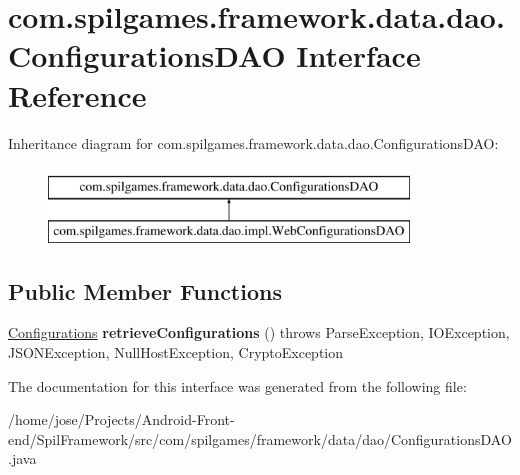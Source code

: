 \hypertarget{interfacecom_1_1spilgames_1_1framework_1_1data_1_1dao_1_1_configurations_d_a_o}{\section{com.\-spilgames.\-framework.\-data.\-dao.\-Configurations\-D\-A\-O Interface Reference}
\label{interfacecom_1_1spilgames_1_1framework_1_1data_1_1dao_1_1_configurations_d_a_o}
}
Inheritance diagram for com.\-spilgames.\-framework.\-data.\-dao.\-Configurations\-D\-A\-O\-:\begin{figure}[H]
\begin{center}
\leavevmode
\includegraphics[height=2.000000cm]{interfacecom_1_1spilgames_1_1framework_1_1data_1_1dao_1_1_configurations_d_a_o}
\end{center}
\end{figure}
\subsection*{Public Member Functions}
\begin{DoxyCompactItemize}
\item 
\hypertarget{interfacecom_1_1spilgames_1_1framework_1_1data_1_1dao_1_1_configurations_d_a_o_a7da18f709873764221307023f2718e97}{\hyperlink{classcom_1_1spilgames_1_1framework_1_1data_1_1_configurations}{Configurations} {\bfseries retrieve\-Configurations} ()  throws Parse\-Exception, I\-O\-Exception, J\-S\-O\-N\-Exception, Null\-Host\-Exception, Crypto\-Exception}\label{interfacecom_1_1spilgames_1_1framework_1_1data_1_1dao_1_1_configurations_d_a_o_a7da18f709873764221307023f2718e97}

\end{DoxyCompactItemize}


The documentation for this interface was generated from the following file\-:\begin{DoxyCompactItemize}
\item 
/home/jose/\-Projects/\-Android-\/\-Front-\/end/\-Spil\-Framework/src/com/spilgames/framework/data/dao/Configurations\-D\-A\-O.\-java\end{DoxyCompactItemize}
